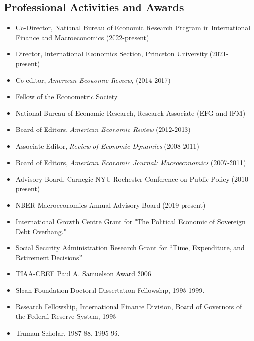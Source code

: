 \documentclass[12pt]{article}
\begin{document}
\subsection*{Professional Activities and Awards}

\begin{itemize}[left=0pt .. \parindent, label=]

\item Co-Director, National Bureau of Economic Research Program in International Finance and Macroeconomics (2022-present)  

\item Director, International Economics Section, Princeton University (2021-present)
  
\item Co-editor, \textit{American Economic Review}, (2014-2017)

\item Fellow of the Econometric Society

\item National Bureau of Economic Research, Research Associate (EFG and IFM)

\item Board of Editors, \textit{American Economic Review} (2012-2013)

\item Associate Editor, \textit{Review of Economic Dynamics} (2008-2011)

\item Board of Editors, \textit{American Economic Journal: Macroeconomics}
(2007-2011)

\item Advisory Board, Carnegie-NYU-Rochester Conference on Public Policy
(2010-present)

\item NBER Macroeconomics Annual Advisory Board (2019-present)

\item International Growth Centre Grant for "The Political Economic of
Sovereign Debt Overhang."

\item Social Security Administration Research Grant for ``Time, Expenditure,
and Retirement Decisions''

\item TIAA-CREF Paul A. Samuelson Award 2006

\item Sloan Foundation Doctoral Dissertation Fellowship, 1998-1999.

\item Research Fellowship, International Finance Division, Board of Governors of the Federal Reserve System, 1998

\item Truman Scholar, 1987-88, 1995-96.

\end{itemize}
 
\end{document}
